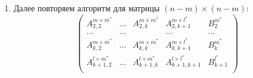 \documentclass[12pt]{article}
\begin{document}
\begin{enumerate}
            \item \label{alg:repeat} Далее повторяем алгоритм для матрицы $(n - m) \times (n - m)$:
            \[
            \left(
            \begin{array}{cccc|c}
            A_{2,2}^{m \times m^*}     & \ldots & A_{2,k}^{m \times m^*}   & A_{2,k+1}^{m \times l^*}       & B^{m^*}_{2}   \\  
            \ldots                     & \ldots &                          & \ldots                         & \ldots        \\  
            A_{k,2}^{m \times m^*}     & \ldots & A_{k,k}^{m \times m^*}   & A_{k,k+1}^{m \times l^*}       & B^{m^*}_{k}   \\  
            A_{k+1,2}^{l \times m^*}   & \ldots & A_{k+1,k}^{l \times m^*} & A_{k+1, k+1}^{l \times l^*}    & B^{l^*}_{k+1} \\
            \end{array}
            \right)
            \]
        
        \end{enumerate}
            
\end{document}

